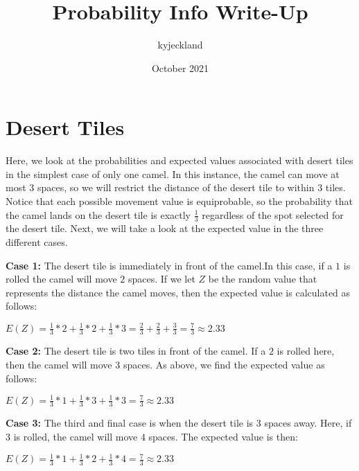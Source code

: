 \documentclass{article}
\title{Probability Info Write-Up}
\author{kyjeckland }
\date{October 2021}
\begin{document}
\maketitle

\section{Desert Tiles}
Here, we look at the probabilities and expected values associated with desert tiles in the simplest case of only one camel. In this instance, the camel can move at most 3 spaces, so we will restrict the distance of the desert tile to within 3 tiles. Notice that each possible movement value is equiprobable, so the probability that the camel lands on the desert tile is exactly $\frac{1}{3}$ regardless of the spot selected for the desert tile. Next, we will take a look at the expected value in the three different cases.

\textbf{Case 1:} The desert tile is immediately in front of the camel.In this case, if a $1$ is rolled the camel will move $2$ spaces. If we let $Z$ be the random value that represents the distance the camel moves, then the expected value is calculated as follows:

\begin{center} $E(Z) = \frac{1}{3}*2 + \frac{1}{3}*2+\frac{1}{3}*3 = \frac{2}{3}+\frac{2}{3}+\frac{3}{3} = \frac{7}{3} \approx 2.33$
\end{center}

\textbf{Case 2:} The desert tile is two tiles in front of the camel. If a $2$ is rolled here, then the camel will move $3$ spaces. As above, we find the expected value as follows:

\begin{center} $E(Z) = \frac{1}{3}*1+\frac{1}{3}*3+\frac{1}{3}*3 = \frac{7}{3} \approx 2.33$
\end{center}

\textbf{Case 3:} The third and final case is when the desert tile is 3 spaces away. Here, if 3 is rolled, the camel will move 4 spaces. The expected value is then:
\begin{center} $E(Z) = \frac{1}{3}*1+\frac{1}{3}*2+\frac{1}{3}*4 = \frac{7}{3} \approx 2.33$
\end{center}
\end{document}
